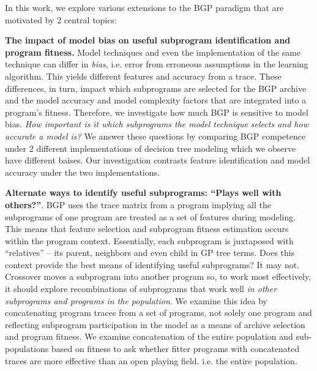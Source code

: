 In this work,  we explore various extensions to the BGP paradigm that are motivated by 2 central topics: \begin{inparaenum}

\item \textbf{The impact of model bias on useful subprogram identification and program fitness.}  Model techniques and even the implementation of the same technique can differ in  \textit{bias}, i.e. error from erroneous assumptions in the learning algorithm. This yields different features and accuracy from a trace. These differences, in turn, impact which subprograms are selected for the BGP archive and the model accuracy and model complexity factors that are integrated into a program's fitness. Therefore, we investigate how much BGP is sensitive to model bias. %
\textit{How important is it which subprograms the model technique selects and how accurate a model is? }  We answer these questions by comparing BGP competence under 2 different implementations of decision tree modeling which we observe have different baises. Our investigation contrasts feature identification and model accuracy under the two implementations. 

\item \textbf{Alternate ways to identify useful subprograms: \textbf{``Plays well with others?''}}. BGP uses the trace matrix from a program implying all the subprograms of one program are treated as a set of features during modeling. This means that feature selection and subprogram fitness estimation occurs within the program context.  Essentially, each subprogram is juxtaposed with ``relatives'' -- its parent, neighbors and even child in GP tree terms. Does this context provide the best means of identifying useful subprograms? It may not. Crossover moves a subprogram into another program so, to work most effectively, it should explore recombinations of subprograms that work well \textit{in other subprograms and programs in the population}. We examine this idea by concatenating program traces from a set of programs, not solely one program and reflecting subprogram participation in the model as a means of archive selection and program fitness. We examine concatenation of the entire population and sub-populations based on fitness to ask whether fitter programs with concatenated traces are more effective than an open playing field. i.e. the entire population.  


\end{inparaenum}
